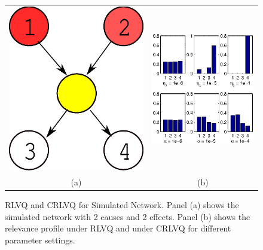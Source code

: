\documentclass{esannV2}
\begin{document}
\begin{figure}
\begin{tabular}{cc}
\includegraphics[scale=0.2]{simnetwork.eps} & 
\includegraphics[width=.6\textwidth, height=.5\textwidth]{simlambda.eps} \\
(a) &  (b)  
\end{tabular}
\label{fig:simnetwork}
\caption{RLVQ and CRLVQ for Simulated Network. Panel (a) shows the simulated network with 2 causes and 2 effects. Panel (b) shows the relevance profile under RLVQ and under CRLVQ for different parameter settings.}
\end{figure}
\end{document}
